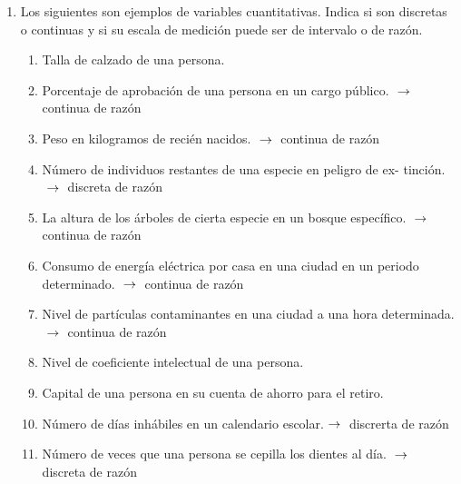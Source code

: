\documentclass[11pt,a4paper]{report}
\begin{document}
\begin{enumerate}
\item Los siguientes son ejemplos de variables cuantitativas. Indica si son discretas o continuas y si su escala de medición puede ser de intervalo o de razón.


\begin{enumerate}
    \item Talla de calzado de una persona. 
    \item Porcentaje de aprobación de una persona en un cargo público. $\hspace{0.1cm} \rightarrow \hspace{0.1cm} $ continua de razón
    \item Peso en kilogramos de recién nacidos. $\hspace{0.1cm} \rightarrow \hspace{0.1cm} $ continua de razón
    \item Número de individuos restantes de una especie en peligro de ex- tinción. $\hspace{0.1cm} \rightarrow \hspace{0.1cm} $ discreta de razón
    \item La altura de los árboles de cierta especie en un bosque específico. $\hspace{0.1cm} \rightarrow \hspace{0.1cm} $ continua de razón
    \item Consumo de energía eléctrica por casa en una ciudad en un periodo determinado. $\hspace{0.1cm} \rightarrow \hspace{0.1cm} $ continua de razón
    \item Nivel de partículas contaminantes en una ciudad a una hora determinada. $\hspace{0.1cm} \rightarrow \hspace{0.1cm} $ continua de razón
    \item Nivel de coeficiente intelectual de una persona.
    \item Capital de una persona en su cuenta de ahorro para el retiro.
    \item Número de días inhábiles en un calendario escolar.$\hspace{0.1cm} \rightarrow \hspace{0.1cm} $ discrerta de razón
    \item Número de veces que una persona se cepilla los dientes al día. $\hspace{0.1cm} \rightarrow \hspace{0.1cm} $ discreta de razón

\end{enumerate}
\end{enumerate}
\end{document}
